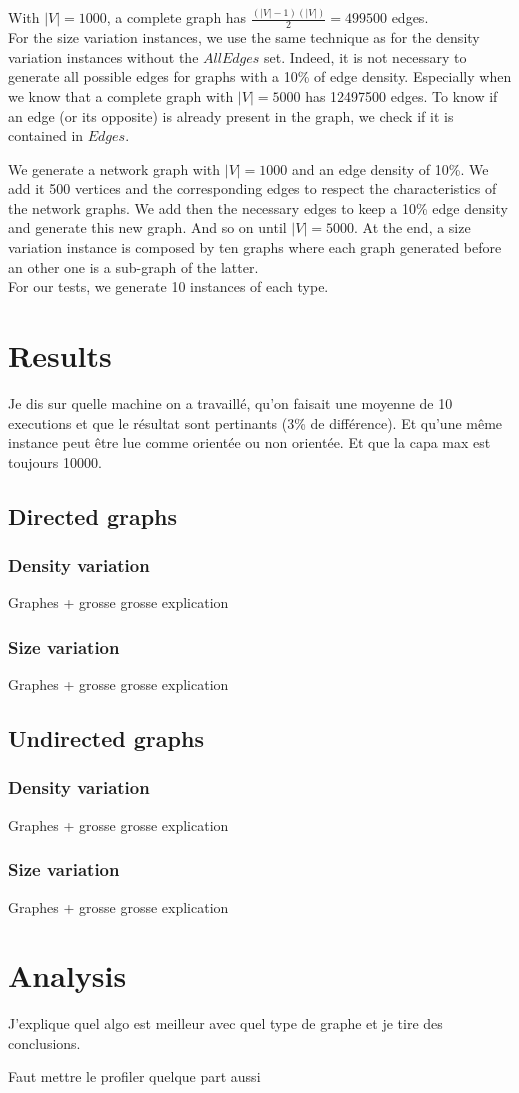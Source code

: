 With $|V|=1000$, a complete graph has $\frac{(|V|-1)(|V|)}{2} = 499500$ edges.\\

For the size variation instances, we use the same technique as for the density variation instances without the $AllEdges$ set. Indeed, it is not necessary to generate all possible edges for graphs with a 10\% of edge density. Especially when we know that a complete graph with $|V|=5000$ has 12497500 edges. To know if an edge (or its opposite) is already present in the graph, we check if it is contained in $Edges$.

We generate a network graph with $|V|=1000$ and an edge density of 10\%. We add it 500 vertices and the corresponding edges to respect the characteristics of the network graphs. We add then the necessary edges to keep a 10\% edge density and generate this new graph. And so on until $|V|=5000$. At the end, a size variation instance is composed by ten graphs where each graph generated before an other one is a sub-graph of the latter. \\

For our tests, we generate 10 instances of each type.

\section{Results}
Je dis sur quelle machine on a travaillé, qu'on faisait une moyenne de 10 executions et que le résultat sont pertinants (3\% de différence). Et qu'une même instance peut être lue comme orientée ou non orientée. Et que la capa max est toujours 10000.
\subsection{Directed graphs}
\subsubsection{Density variation}
Graphes + grosse grosse explication
\subsubsection{Size variation}
Graphes + grosse grosse explication
\subsection{Undirected graphs}
\subsubsection{Density variation}
Graphes + grosse grosse explication
\subsubsection{Size variation}
Graphes + grosse grosse explication
\section{Analysis}
J'explique quel algo est meilleur avec quel type de graphe et je tire des conclusions.

Faut mettre le profiler quelque part aussi